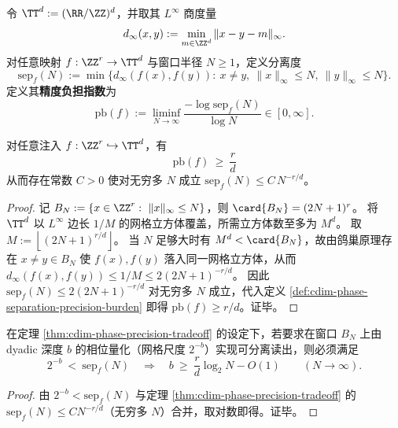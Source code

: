 \begin{definition}[分离度与精度负担指数]\label{def:cdim-phase-separation-precision-burden}
令 \(\TT^{d}:=(\RR/\ZZ)^{d}\)，并取其 \(L^\infty\) 商度量
\[
d_\infty(x,y):=\min_{m\in\ZZ^{d}}\|x-y-m\|_\infty.
\]
对任意映射 \(f:\ZZ^{r}\to \TT^{d}\) 与窗口半径 \(N\ge 1\)，定义分离度
\[
\mathrm{sep}_{f}(N)
:=\min\bigl\{d_\infty(f(x),f(y)):\ x\neq y,\ \|x\|_\infty\le N,\ \|y\|_\infty\le N\bigr\}.
\]
定义其\textbf{精度负担指数}为
\[
\mathrm{pb}(f):=\liminf_{N\to\infty}\frac{-\log \mathrm{sep}_{f}(N)}{\log N}\in[0,\infty].
\]
\end{definition}

\begin{theorem}[相位--精度权衡不等式]\label{thm:cdim-phase-precision-tradeoff}
对任意注入 \(f:\ZZ^{r}\hookrightarrow \TT^{d}\)，有
\[
\boxed{\;\mathrm{pb}(f)\ \ge\ \frac{r}{d}\;}
\]
从而存在常数 \(C>0\) 使对无穷多 \(N\) 成立
\(
\mathrm{sep}_{f}(N)\le C\,N^{-r/d}
\)。
\end{theorem}
\begin{proof}
记 \(B_N:=\{x\in\ZZ^{r}:\ \|x\|_\infty\le N\}\)，则 \(\card{B_N}=(2N+1)^{r}\)。
将 \(\TT^{d}\) 以 \(L^\infty\) 边长 \(1/M\) 的网格立方体覆盖，所需立方体数至多为 \(M^{d}\)。
取 \(M:=\left\lfloor(2N+1)^{r/d}\right\rfloor\)。
当 \(N\) 足够大时有 \(M^{d}<\card{B_N}\)，故由鸽巢原理存在 \(x\neq y\in B_N\) 使 \(f(x),f(y)\) 落入同一网格立方体，从而
\(
d_\infty(f(x),f(y))\le 1/M\le 2(2N+1)^{-r/d}
\)。
因此 \(\mathrm{sep}_{f}(N)\le 2(2N+1)^{-r/d}\) 对无穷多 \(N\) 成立，代入定义 \ref{def:cdim-phase-separation-precision-burden} 即得 \(\mathrm{pb}(f)\ge r/d\)。证毕。
\end{proof}

\begin{corollary}\label{cor:cdim-phase-precision-tradeoff-dyadic}
在定理 \ref{thm:cdim-phase-precision-tradeoff} 的设定下，若要求在窗口 \(B_N\) 上由 dyadic 深度 \(b\) 的相位量化（网格尺度 \(2^{-b}\)）实现可分离读出，则必须满足
\[
2^{-b}\ <\ \mathrm{sep}_{f}(N)
\quad\Longrightarrow\quad
b\ \ge\ \frac{r}{d}\log_2 N - O(1)
\qquad(N\to\infty).
\]
\end{corollary}
\begin{proof}
由 \(2^{-b}<\mathrm{sep}_{f}(N)\) 与定理 \ref{thm:cdim-phase-precision-tradeoff} 的 \(\mathrm{sep}_{f}(N)\le C N^{-r/d}\)（无穷多 \(N\)）合并，取对数即得。证毕。
\end{proof}

